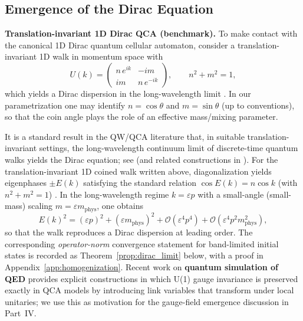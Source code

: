 \subsection{Emergence of the Dirac Equation}
\noindent\textbf{Translation-invariant 1D Dirac QCA (benchmark).}
To make contact with the canonical 1D Dirac quantum cellular automaton, consider a translation-invariant 1D walk in momentum space with
\begin{equation}
    U(k)=
    \begin{pmatrix}
    n\,e^{ik} & -i m\\
    i m & n\,e^{-ik}
    \end{pmatrix},
    \qquad
    n^2+m^2=1,
\end{equation}
which yields a Dirac dispersion in the long-wavelength limit \cite{Dariano2014,Bisio2015}. In our parametrization one may identify $n=\cos\theta$ and $m=\sin\theta$ (up to conventions), so that the coin angle plays the role of an effective mass/mixing parameter.

It is a standard result in the QW/QCA literature that, in suitable translation-invariant settings, the long-wavelength continuum limit of discrete-time quantum walks yields the Dirac equation; see \cite{Arrighi2014,Dariano2014} (and related constructions in \cite{Bisio2015}).
For the translation-invariant 1D coined walk written above, diagonalization yields eigenphases $\pm E(k)$ satisfying the standard relation $\cos E(k)=n\cos k$ (with $n^2+m^2=1$) \cite{Dariano2014,Bisio2015}. In the long-wavelength regime $k=\varepsilon p$ with a small-angle (small-mass) scaling $m=\varepsilon m_{\mathrm{phys}}$, one obtains
\begin{equation}
    E(k)^2=(\varepsilon p)^2+(\varepsilon m_{\mathrm{phys}})^2+\mathcal{O}(\varepsilon^4 p^4)+\mathcal{O}(\varepsilon^4 p^2 m_{\mathrm{phys}}^2),
\end{equation}
so that the walk reproduces a Dirac dispersion at leading order. The corresponding \emph{operator-norm} convergence statement for band-limited initial states is recorded as Theorem~\ref{prop:dirac_limit} below, with a proof in Appendix~\ref{app:homogenization}.
Recent work on \textbf{quantum simulation of QED} \cite{Arrighi2019} provides explicit constructions in which U(1) gauge invariance is preserved exactly in QCA models by introducing link variables that transform under local unitaries; we use this as motivation for the gauge-field emergence discussion in Part~IV.

